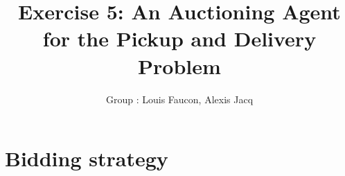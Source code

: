 \documentclass[11pt]{article}
\title{\bf Exercise 5: An Auctioning Agent for the Pickup and Delivery Problem}
\author{Group \textnumero 10: Louis Faucon, Alexis Jacq}
\begin{document}
\maketitle

\section{Bidding strategy}
\end{document}
